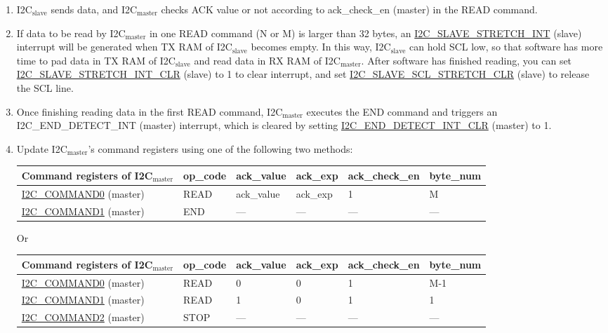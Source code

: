 \documentclass[main\_\_EN.tex]{subfiles}
\begin{document}
\begin{enumerate}
\item I2C$_\text{slave}$ sends data, and I2C$_\text{master}$ checks ACK value or not according to ack\_check\_en (master) in the READ command.
\item If data to be read by I2C$_\text{master}$ in one READ command (N or M) is larger than 32 bytes, an \hyperref[int:i2c-slave-stretch]{I2C\_SLAVE\_STRETCH\_INT} (slave) interrupt will be generated when TX RAM of I2C$_\text{slave}$ becomes empty. In this way, I2C$_\text{slave}$ can hold SCL low, so that software has more time to pad data in TX RAM of I2C$_\text{slave}$ and read data in RX RAM of I2C$_\text{master}$. After software has finished reading, you can set \hyperref[fielddesc:I2CSLAVESTRETCHINTCLR]{I2C\_SLAVE\_STRETCH\_INT\_CLR} (slave) to 1 to clear interrupt, and set \hyperref[fielddesc:I2CSLAVESCLSTRETCHCLR]{I2C\_SLAVE\_SCL\_STRETCH\_CLR} (slave) to release the SCL line.
\item Once finishing reading data in the first READ command, I2C$_\text{master}$ executes the END command and triggers an I2C\_END\_DETECT\_INT (master) interrupt, which is cleared by setting \hyperref[fielddesc:I2CENDDETECTINTCLR]{I2C\_END\_DETECT\_INT\_CLR} (master) to 1.
\item Update I2C$_\text{master}$'s command registers using one of the following two methods:
\begin{longtable}{ | p{4cm} | p{2cm} | p{2cm} | p{2cm} |p{2cm} | p{2cm} |}
\hline\rowcolor{lightgray}
Command registers of I2C$_\text{master}$& op\_code & ack\_value&ack\_exp&ack\_check\_en&byte\_num  \\ \hline
\hyperref[fielddesc:I2CCOMMAND0]{I2C\_COMMAND0} (master)& READ& ack\_value&ack\_exp&1&M  \\ \hline
\hyperref[fielddesc:I2CCOMMAND1]{I2C\_COMMAND1} (master)& END& ---&---&---&---  \\ \hline
\end{longtable}
Or
\begin{longtable}{ | p{4cm} | p{2cm} | p{2cm} | p{2cm} |p{2cm} | p{2cm} |}
\hline\rowcolor{lightgray}
Command registers of I2C$_\text{master}$& op\_code & ack\_value&ack\_exp&ack\_check\_en&byte\_num  \\ \hline
\hyperref[fielddesc:I2CCOMMAND0]{I2C\_COMMAND0} (master)& READ& 0&0&1&M-1  \\ \hline
\hyperref[fielddesc:I2CCOMMAND1]{I2C\_COMMAND1} (master)& READ& 1&0&1&1  \\ \hline
\hyperref[fielddesc:I2CCOMMAND2]{I2C\_COMMAND2} (master)& STOP& ---&---&---&---  \\ \hline
\end{longtable}


\end{enumerate}
\end{document}
